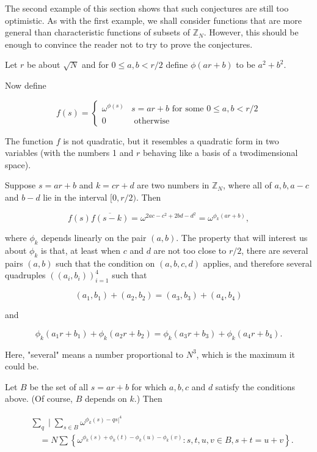 \documentclass[10pt]{article}
\begin{document}
The second example of this section shows that such conjectures are still too optimistic. As with the first example, we shall consider functions that are more general than characteristic functions of subsets of $\mathbb{Z}_{N}$. However, this should be enough to convince the reader not to try to prove the conjectures.

Let $r$ be about $\sqrt{N}$ and for $0 \leqslant a, b<r / 2$ define $\phi(a r+b)$ to be $a^{2}+b^{2}$.

Now define

$$
f(s)= \begin{cases}\omega^{\phi(s)} & s=a r+b \text { for some } 0 \leqslant a, b<r / 2 \\ 0 & \text { otherwise }\end{cases}
$$

The function $f$ is not quadratic, but it resembles a quadratic form in two variables (with the numbers 1 and $r$ behaving like a basis of a twodimensional space).

Suppose $s=a r+b$ and $k=c r+d$ are two numbers in $\mathbb{Z}_{N}$, where all of $a, b, a-c$ and $b-d$ lie in the interval $[0, r / 2)$. Then

$$
f(s) \overline{f(s-k)}=\omega^{2 a c-c^{2}+2 b d-d^{2}}=\omega^{\phi_{k}(a r+b)},
$$

where $\phi_{k}$ depends linearly on the pair $(a, b)$. The property that will interest us about $\phi_{k}$ is that, at least when $c$ and $d$ are not too close to $r / 2$, there are several pairs $(a, b)$ such that the condition on $(a, b, c, d)$ applies, and therefore several quadruples $\left(\left(a_{i}, b_{i}\right)\right)_{i=1}^{4}$ such that

$$
\left(a_{1}, b_{1}\right)+\left(a_{2}, b_{2}\right)=\left(a_{3}, b_{3}\right)+\left(a_{4}, b_{4}\right)
$$

and

$$
\phi_{k}\left(a_{1} r+b_{1}\right)+\phi_{k}\left(a_{2} r+b_{2}\right)=\phi_{k}\left(a_{3} r+b_{3}\right)+\phi_{k}\left(a_{4} r+b_{4}\right) .
$$

Here, "several" means a number proportional to $N^{3}$, which is the maximum it could be.

Let $B$ be the set of all $s=a r+b$ for which $a, b, c$ and $d$ satisfy the conditions above. (Of course, $B$ depends on $k$.) Then

$$
\begin{aligned}
& \sum_{q} \mid \sum_{s \in B} \omega^{\phi_{k}(s)-\left.q s\right|^{4}} \\
& \quad=N \sum\left\{\omega^{\phi_{k}(s)+\phi_{k}(t)-\phi_{k}(u)-\phi_{k}(v)}: s, t, u, v \in B, s+t=u+v\right\} .
\end{aligned}
$$
\end{document}
